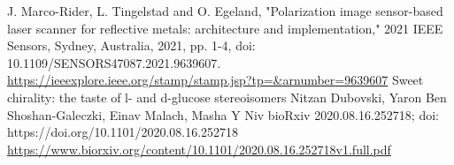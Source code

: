 \documentclass[a4paper]{article}
\numberwithin{equation}{section}
\begin{document}
\begin{thebibliography}{99}
         J. Marco-Rider, L. Tingelstad and O. Egeland, "Polarization image sensor-based laser scanner for reflective metals: architecture and implementation," 2021 IEEE Sensors, Sydney, Australia, 2021, pp. 1-4, doi: 10.1109/SENSORS47087.2021.9639607. \url{https://ieeexplore.ieee.org/stamp/stamp.jsp?tp=&arnumber=9639607}
          Sweet chirality: the taste of l- and d-glucose stereoisomers
        Nitzan Dubovski, Yaron Ben Shoshan-Galeczki, Einav Malach, Masha Y Niv
        bioRxiv 2020.08.16.252718; doi: https://doi.org/10.1101/2020.08.16.252718 \url{https://www.biorxiv.org/content/10.1101/2020.08.16.252718v1.full.pdf}
    \end{thebibliography}
\end{document}
